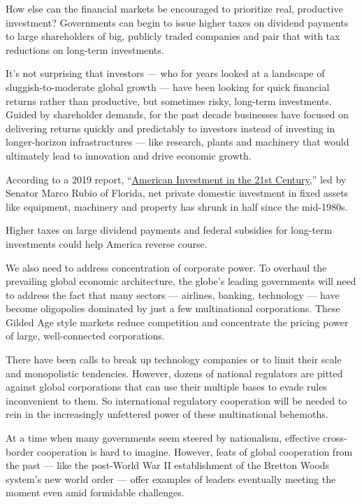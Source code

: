 How else can the financial markets be encouraged to prioritize real,
productive investment? Governments can begin to issue higher taxes on
dividend payments to large shareholders of big, publicly traded
companies and pair that with tax reductions on long-term investments.

It's not surprising that investors --- who for years looked at a
landscape of sluggish-to-moderate global growth --- have been looking
for quick financial returns rather than productive, but sometimes risky,
long-term investments. Guided by shareholder demands, for the past
decade businesses have focused on delivering returns quickly and
predictably to investors instead of investing in longer-horizon
infrastructures --- like research, plants and machinery that would
ultimately lead to innovation and drive economic growth.

According to a 2019 report,
``\href{https://www.rubio.senate.gov/public/_cache/files/9f25139a-6039-465a-9cf1-feb5567aebb7/4526E9620A9A7DB74267ABEA5881022F.5.15.2019.-final-project-report-american-investment.pdf}{American
Investment in the 21st Century},'' led by Senator Marco Rubio of
Florida, net private domestic investment in fixed assets like equipment,
machinery and property has shrunk in half since the mid-1980s.

Higher taxes on large dividend payments and federal subsidies for
long-term investments could help America reverse course.

We also need to address concentration of corporate power. To overhaul
the prevailing global economic architecture, the globe's leading
governments will need to address the fact that many sectors ---
airlines, banking, technology --- have become oligopolies dominated by
just a few multinational corporations. These Gilded Age style markets
reduce competition and concentrate the pricing power of large,
well-connected corporations.

There have been calls to break up technology companies or to limit their
scale and monopolistic tendencies. However, dozens of national
regulators are pitted against global corporations that can use their
multiple bases to evade rules inconvenient to them. So international
regulatory cooperation will be needed to rein in the increasingly
unfettered power of these multinational behemoths.

At a time when many governments seem steered by nationalism, effective
cross-border cooperation is hard to imagine. However, feats of global
cooperation from the past --- like the post-World War II establishment
of the Bretton Woods system's new world order --- offer examples of
leaders eventually meeting the moment even amid formidable challenges.

